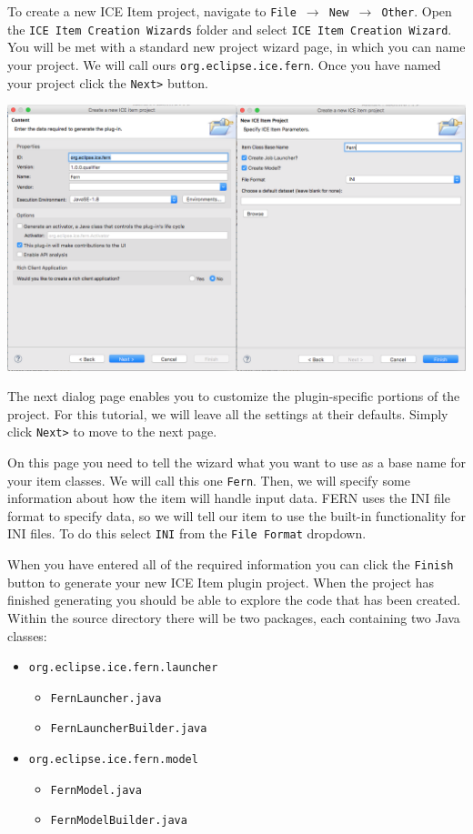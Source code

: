 To create a new ICE Item project, navigate to \texttt{File $\rightarrow$ New
$\rightarrow$ Other}. Open the \texttt{ICE Item Creation Wizards} folder and 
select \texttt{ICE Item Creation Wizard}. You will be met with a standard new
project wizard page, in which you can name your project.  We will call ours
\texttt{org.eclipse.ice.fern}. Once you have named your project click the \texttt{Next>} button.
\begin{center} \includegraphics[width=\textwidth]{figures/comb23} \end{center}

The next dialog page enables you to customize the plugin-specific
portions of the project. For this tutorial, we will leave all the settings at
their defaults. Simply click \texttt{Next>} to move to the next page. 

On this page you need to tell the wizard what you want to use as a base
name for your item classes. We will call this one \texttt{Fern}. Then, we will
specify some information about how the item will handle input data.  FERN uses
the INI file format to specify data, so we will tell our item to use the built-in
functionality for INI files.  To do this select \texttt{INI} from the \texttt{File Format} dropdown.  

When you have entered all of the required information you can
click the \texttt{Finish} button to generate your new ICE Item plugin project.
When the project has finished generating you should be able to explore the code
that has been created.  Within the source directory there will be two packages,
each containing two Java classes:

\begin{itemize} 
    \item \texttt{org.eclipse.ice.fern.launcher} 
    \begin{itemize}
        \item \texttt{FernLauncher.java} 
        \item \texttt{FernLauncherBuilder.java}
    \end{itemize} 
    \item \texttt{org.eclipse.ice.fern.model} 
    \begin{itemize} 
        \item \texttt{FernModel.java} 
        \item \texttt{FernModelBuilder.java}
    \end{itemize} 
\end{itemize}

